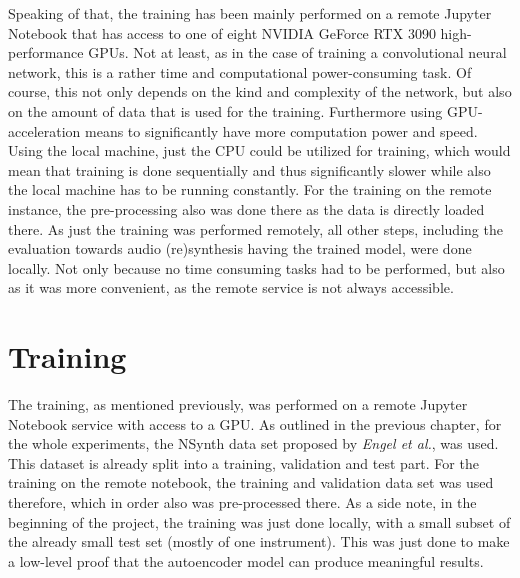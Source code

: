 Speaking of that, the training has been mainly performed on a remote Jupyter Notebook that has access to one of eight NVIDIA GeForce RTX 3090 high-performance GPUs. Not at least, as in the case of training a convolutional neural network, this is a rather time and computational power-consuming task. Of course, this not only depends on the kind and complexity of the network, but also on the amount of data that is used for the training. Furthermore using GPU-acceleration means to significantly have more computation power and speed. Using the local machine, just the CPU could be utilized for training, which would mean that training is done sequentially and thus significantly slower while also the local machine has to be running constantly. For the training on the remote instance, the pre-processing also was done there as the data is directly loaded there. 
As just the training was performed remotely, all other steps, including the evaluation towards audio (re)synthesis having the trained model, were done locally. Not only because no time consuming tasks had to be performed, but also as it was more convenient, as the remote service is not always accessible.


\section{Training}
The training, as mentioned previously, was performed on a remote Jupyter Notebook service with access to a GPU. As outlined in the previous chapter, for the whole experiments, the NSynth data set proposed by \textit{Engel et al.}\cite{Engel2017}, was used. This dataset is already split into a training, validation and test part. For the training on the remote notebook, the training and validation data set was used therefore, which in order also was pre-processed there. As a side note, in the beginning of the project, the training was just done locally, with a small subset of the already small test set (mostly of one instrument). This was just done to make a low-level proof that the autoencoder model can produce meaningful results. 

